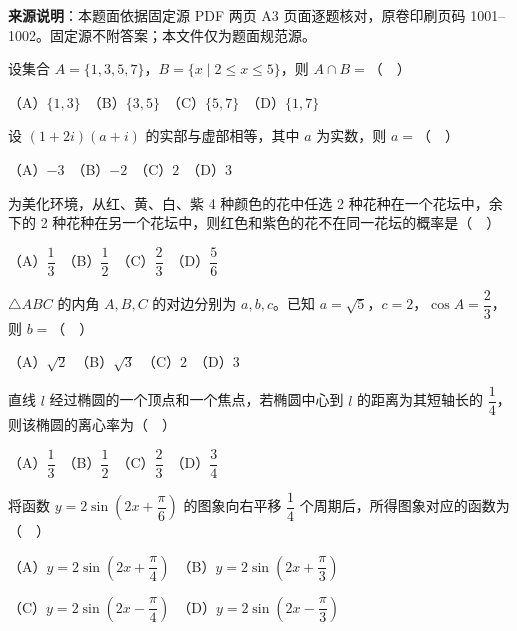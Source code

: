 


\begin{gktip}
\textbf{来源说明}：本题面依据固定源 PDF 两页 A3 页面逐题核对，原卷印刷页码 1001–1002。固定源不附答案；本文件仅为题面规范源。
\end{gktip}


\begin{question}
设集合 \(A=\{1,3,5,7\}\)，\(B=\{x\mid 2\leq x\leq 5\}\)，则 \(A\cap B=\)（　）

   （A）\(\{1,3\}\)　（B）\(\{3,5\}\)　（C）\(\{5,7\}\)　（D）\(\{1,7\}\)

\end{question}
\begin{question}
设 \((1+2i)(a+i)\) 的实部与虚部相等，其中 \(a\) 为实数，则 \(a=\)（　）

   （A）\(-3\)　（B）\(-2\)　（C）\(2\)　（D）\(3\)

\end{question}
\begin{question}
为美化环境，从红、黄、白、紫 4 种颜色的花中任选 2 种花种在一个花坛中，余下的 2 种花种在另一个花坛中，则红色和紫色的花不在同一花坛的概率是（　）

   （A）\(\dfrac{1}{3}\)　（B）\(\dfrac{1}{2}\)　（C）\(\dfrac{2}{3}\)　（D）\(\dfrac{5}{6}\)

\end{question}
\begin{question}
\(\triangle ABC\) 的内角 \(A,B,C\) 的对边分别为 \(a,b,c\)。已知 \(a=\sqrt{5}\)，\(c=2\)，\(\cos A=\dfrac{2}{3}\)，则 \(b=\)（　）

   （A）\(\sqrt{2}\)　（B）\(\sqrt{3}\)　（C）\(2\)　（D）\(3\)

\end{question}
\begin{question}
直线 \(l\) 经过椭圆的一个顶点和一个焦点，若椭圆中心到 \(l\) 的距离为其短轴长的 \(\dfrac{1}{4}\)，则该椭圆的离心率为（　）

   （A）\(\dfrac{1}{3}\)　（B）\(\dfrac{1}{2}\)　（C）\(\dfrac{2}{3}\)　（D）\(\dfrac{3}{4}\)

\end{question}
\begin{question}
将函数 \(y=2\sin\left(2x+\dfrac{\pi}{6}\right)\) 的图象向右平移 \(\dfrac{1}{4}\) 个周期后，所得图象对应的函数为（　）

   （A）\(y=2\sin\left(2x+\dfrac{\pi}{4}\right)\)　（B）\(y=2\sin\left(2x+\dfrac{\pi}{3}\right)\)

   （C）\(y=2\sin\left(2x-\dfrac{\pi}{4}\right)\)　（D）\(y=2\sin\left(2x-\dfrac{\pi}{3}\right)\)

\Needspace{0.4\textheight}
\end{question}
